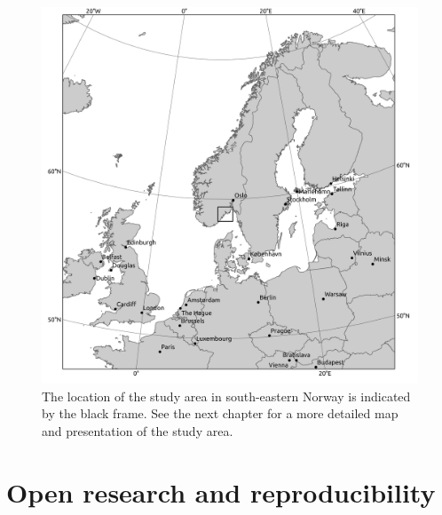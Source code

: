 \documentclass[
  12pt,
  a4paper,
  oneside]{book}
\begin{document}
\begin{figure}

{\centering \includegraphics[width=1\linewidth]{figures/large_overview} 

}

\caption{The location of the study area in south-eastern Norway is indicated by the black frame. See the next chapter for a more detailed map and presentation of the study area.}\label{fig:map}
\end{figure}

\hypertarget{open-research-and-reproducibility}{%
\section{Open research and reproducibility}\label{open-research-and-reproducibility}}
\end{document}
